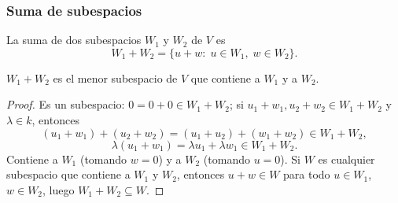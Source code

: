 \begin{frame}[allowframebreaks, t]
    \frametitle{Suma de subespacios}

    \begin{definition}
        La \alert{suma} de dos subespacios $W_1$ y $W_2$ de $V$ es
        \[
            W_1+W_2=\{u+w:\; u\in W_1,\; w\in W_2\}.
        \]
    \end{definition}

    \begin{proposition}
        $W_1+W_2$ es el menor subespacio de $V$ que contiene a $W_1$
        y a $W_2$.
    \end{proposition}

    \begin{proof}
        Es un subespacio: $0=0+0\in W_1+W_2$; si $u_1+w_1,u_2+w_2\in
        W_1+W_2$ y $\lambda\in k$, entonces
        \[
            (u_1+w_1)+(u_2+w_2)=(u_1+u_2)+(w_1+w_2)\in W_1+W_2,
        \]
        \[
            \lambda(u_1+w_1)=\lambda u_1+\lambda w_1\in W_1+W_2.
        \]
        Contiene a $W_1$ (tomando $w=0$) y a $W_2$ (tomando $u=0$).
        Si $W$ es cualquier subespacio que contiene a $W_1$ y $W_2$,
        entonces $u+w\in W$ para todo $u\in W_1$, $w\in W_2$,
        luego $W_1+W_2\subseteq W$.
    \end{proof}
\end{frame}


